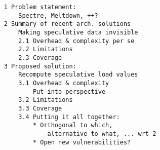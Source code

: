 \begin{verbatim}
    1 Problem statement: 
        Spectre, Meltdown, ++?
    2 Summary of recent arch. solutions
        Making speculative data invisible
        2.1 Overhead & complexity per se
        2.2 Limitations
        2.3 Coverage
    3 Proposed solution: 
        Recompute speculative load values
        3.1 Overhead & complexity 
            Put into perspective
        3.2 Limitations 
        3.3 Coverage
        3.4 Putting it all together:
            * Orthogonal to which, 
                alternative to what, ... wrt 2
            * Open new vulnerabilities?
\end{verbatim}





